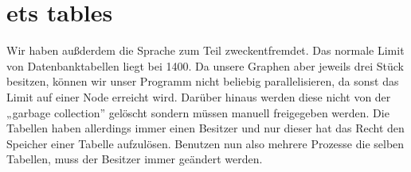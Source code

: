 \section{ets tables}
\label{sec:ets}

Wir haben außderdem die Sprache zum Teil zweckentfremdet.  Das normale
Limit von Datenbanktabellen liegt bei 1400.  Da unsere Graphen aber
jeweils drei Stück besitzen, können wir unser Programm nicht beliebig
parallelisieren, da sonst das Limit auf einer Node erreicht wird.
Darüber hinaus werden diese nicht von der „garbage collection”
gelöscht sondern müssen manuell freigegeben werden.  Die Tabellen
haben allerdings immer einen Besitzer und nur dieser hat das Recht den
Speicher einer Tabelle aufzulösen.  Benutzen nun also mehrere Prozesse
die selben Tabellen, muss der Besitzer immer geändert werden.

